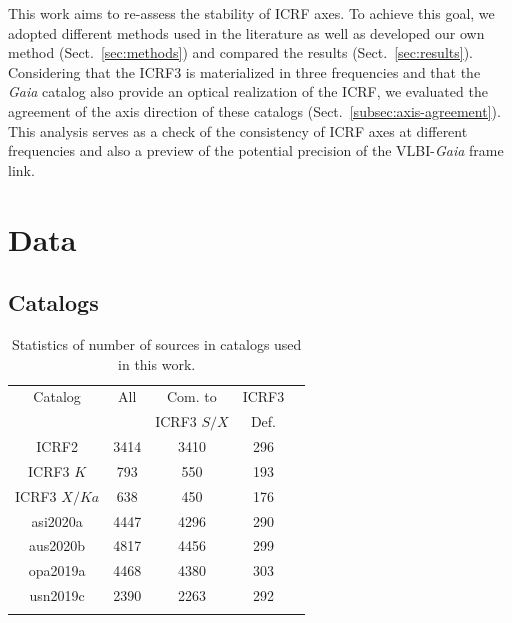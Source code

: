 \documentclass{aa}
\begin{document}
    This work aims to re-assess the stability of ICRF axes.
    To achieve this goal, we adopted different methods used in the literature as well as developed our own method (Sect.~\ref{sec:methods}) and compared the results (Sect.~\ref{sec:results}).
    Considering that the ICRF3 is materialized in three frequencies and that the \textit{Gaia} catalog also provide an optical realization of the ICRF, we evaluated the agreement of the axis direction of these catalogs (Sect.~\ref{subsec:axis-agreement}).
    This analysis serves as a check of the consistency of ICRF axes at different frequencies and also a preview of the potential precision of the VLBI-\textit{Gaia} frame link.



\section{Data}  \label{sec:data}


\subsection{Catalogs}  \label{subsec:catalogs}

\begin{table}
    \centering
    \caption[]{Statistics of number of sources in catalogs used in this work.}
    \label{tab:cat-stats}
    \begin{tabular}{ccccc}
        \hline
        \noalign{\smallskip}
        Catalog     &All    &Com. to        &ICRF3   \\
                    &       &ICRF3 $S/X$    & Def.   \\
        \noalign{\smallskip}
        \hline
        \noalign{\smallskip}
        ICRF2           &3414   &3410   &296 \\ 
        ICRF3 $K$       & 793   & 550   &193 \\
        ICRF3 $X/Ka$    & 638   & 450   &176 \\
        asi2020a        &4447   &4296   &290 \\
        aus2020b        &4817   &4456   &299 \\
        opa2019a        &4468   &4380   &303 \\
        usn2019c        &2390   &2263   &292 \\
        \noalign{\smallskip}
        \hline
    \end{tabular}
\end{table}
    
\end{document}
